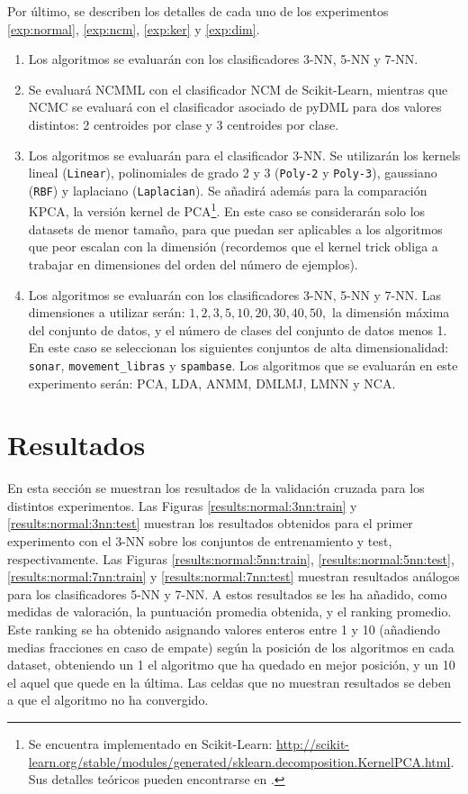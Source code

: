 Por último, se describen los detalles de cada uno de los experimentos \ref{exp:normal}, \ref{exp:ncm}, \ref{exp:ker} y \ref{exp:dim}.
\begin{enumerate}
    \item Los algoritmos se evaluarán con los clasificadores 3-NN, 5-NN y 7-NN.
    \item Se evaluará NCMML con el clasificador NCM de Scikit-Learn, mientras que NCMC se evaluará con el clasificador asociado de pyDML para dos valores distintos: 2 centroides por clase y 3 centroides por clase.
    \item Los algoritmos se evaluarán para el clasificador 3-NN. Se utilizarán los kernels lineal (\texttt{Linear}), polinomiales de grado 2 y 3 (\texttt{Poly-2} y \texttt{Poly-3}), gaussiano (\texttt{RBF}) y laplaciano (\texttt{Laplacian}). Se añadirá además para la comparación KPCA, la versión kernel de PCA\footnote{Se encuentra implementado en Scikit-Learn: \url{http://scikit-learn.org/stable/modules/generated/sklearn.decomposition.KernelPCA.html}. Sus detalles teóricos pueden encontrarse en \cite{kpca}.}. En este caso se considerarán solo los datasets de menor tamaño, para que puedan ser aplicables a los algoritmos que peor escalan con la dimensión (recordemos que el kernel trick obliga a trabajar en dimensiones del orden del número de ejemplos).
    \item Los algoritmos se evaluarán con los clasificadores 3-NN, 5-NN y 7-NN. Las dimensiones a utilizar serán: $1, 2, 3, 5, 10, 20, 30, 40, 50, $ la dimensión máxima del conjunto de datos, y el número de clases del conjunto de datos menos 1. En este caso se seleccionan los siguientes conjuntos de alta dimensionalidad: \texttt{sonar}, \texttt{movement\_libras} y \texttt{spambase}. Los algoritmos que se evaluarán en este experimento serán: PCA, LDA, ANMM, DMLMJ, LMNN y NCA.
\end{enumerate}

\section{Resultados}

En esta sección se muestran los resultados de la validación cruzada para los distintos experimentos. Las Figuras \ref{results:normal:3nn:train} y \ref{results:normal:3nn:test} muestran los resultados obtenidos para el primer experimento con el 3-NN sobre los conjuntos de entrenamiento y test, respectivamente. Las Figuras \ref{results:normal:5nn:train}, \ref{results:normal:5nn:test}, \ref{results:normal:7nn:train} y \ref{results:normal:7nn:test} muestran resultados análogos para los clasificadores 5-NN y 7-NN. A estos resultados se les ha añadido, como medidas de valoración, la puntuación promedia obtenida, y el ranking promedio. Este ranking se ha obtenido asignando valores enteros entre 1 y 10 (añadiendo medias fracciones en caso de empate) según la posición de los algoritmos en cada dataset, obteniendo un 1 el algoritmo que ha quedado en mejor posición, y un 10 el aquel que quede en la última. Las celdas que no muestran resultados se deben a que el algoritmo no ha convergido.


